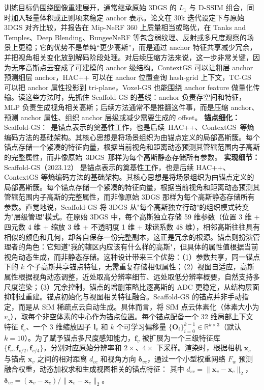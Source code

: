 训练目标仍围绕图像重建展开，通常继承原始 3DGS 的 $L_1$ 与 D-SSIM 组合，同时加入轻量体积或正则项来稳定 anchor 表示。论文在 30k 迭代设定下与原始 3DGS 对齐比较，并报告在 Mip-NeRF 360 上质量相当或略优，在 Tanks and Temples、Deep Blending、BungeeNeRF 等包含弱纹理、反射或多尺度观察的场景上更稳；它的优势不是单纯“更少高斯”，而是通过 anchor 特征共享减少冗余，并把视角相关变化放到解码阶段处理。对后续压缩方法来说，这一步非常关键，因为无序高斯点云变成了可建模的 anchor 级结构。ContextGS 可以让粗层 anchor 预测细层 anchor，HAC++ 可以在 anchor 位置查询 hash-grid 上下文，TC-GS 可以把 anchor 属性投影到 tri-plane，Voxel-GS 也能围绕 anchor feature 做量化传输。读这些方法时，先抓住 Scaffold-GS 的基线：anchor 负责存空间和特征，MLP 负责生成视角相关高斯；后续方法通常不是推翻这件事，而是压缩 anchor、预测 anchor 属性、组织 anchor 层级或减少需要生成的 offset。
\textbf{锚点细化：} Scaffold-GS：~是锚点表示的奠基性工作，也是后续~HAC++、ContextGS~等熵编码方法的基础架构。其核心思想是将场景组织为由锚点定义的局部高斯簇。每个锚点存储一个紧凑的特征向量，根据当前视角和距离动态预测其管辖范围内子高斯的完整属性，而非像原始~3DGS~那样为每个高斯静态存储所有参数。
\textbf{实现细节：} Scaffold-GS（2023.12） 是锚点表示的奠基性工作，也是后续 HAC++、ContextGS 等熵编码方法的基础架构。其核心思想是将场景组织为由锚点定义的局部高斯簇。每个锚点存储一个紧凑的特征向量，根据当前视角和距离动态预测其管辖范围内子高斯的完整属性，而非像原始 3DGS 那样为每个高斯静态存储所有参数。直觉地说，Scaffold-GS 将 3DGS 从"每个高斯独立行动"的组织模式转变为"层级管理"模式。在原始 3DGS 中，每个高斯独立存储 59 维参数（位置 3 维 + 四元数 4 维 + 缩放 3 维 + 不透明度 1 维 + 球谐系数 48 维），相邻高斯往往具有相似的颜色和几何，却各自保存一份完整副本，这正是冗余的根源。锚点则扮演管理者的角色：它知道"我的辖区内应该有什么样的高斯"，但具体的属性值根据当前视角动态生成，而非静态存储。这种设计带来三个优势：（1）参数共享，同一锚点下的 $k$ 个子高斯共享锚点特征，无需重复存储相似属性；（2）视图自适应，高斯属性根据视角动态调整，近处取高分辨率细节、远处取低分辨率概要，自然支持多尺度渲染；（3）冗余控制，锚点的增删策略比逐高斯的 ADC 更稳定，从结构层面抑制过重建。锚点初始化与视图相关特征融合。Scaffold-GS 的锚点并非手动指定，而是从 SfM 稀疏点云自动生成。具体而言，将 SfM 点云体素化（体素大小为 $v_s$），取每个非空体素的中心作为锚点位置。每个锚点配备一个 32 维局部上下文特征 $\mathbf{f}_v$、一个 3 维缩放因子 $\mathbf{l}_v$ 和 $k$ 个可学习偏移量 $\{\mathbf{O}_i\}_{i=0}^{k-1} \in \mathbb{R}^{k \times 3}$（默认 $k=10$）。为了赋予锚点多尺度感知能力，$\mathbf{f}_v$ 被扩展为一个三级特征库 $\{\mathbf{f}_v, \mathbf{f}_{v/2}, \mathbf{f}_{v/4}\}$，分别对应原始分辨率和 $2\times$、$4\times$ 下采样。渲染时，根据相机 $\mathbf{x}_c$ 与锚点 $\mathbf{x}_v$ 之间的相对距离 $d_{vc}$ 和视角方向 $\boldsymbol{\delta}_{vc}$，通过一个小型权重网络 $F_w$ 预测融合权重，动态加权求和生成视图相关的锚点特征： 其中 $d_{vc} = \|\mathbf{x}_v - \mathbf{x}_c\|_2$，$\boldsymbol{\delta}_{vc} = (\mathbf{x}_v - \mathbf{x}_c) / \|\mathbf{x}_v - \mathbf{x}_c\|_2$。

